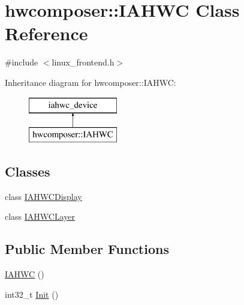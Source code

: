 \hypertarget{classhwcomposer_1_1IAHWC}{}\section{hwcomposer\+:\+:I\+A\+H\+WC Class Reference}
\label{classhwcomposer_1_1IAHWC}


{\ttfamily \#include $<$linux\+\_\+frontend.\+h$>$}

Inheritance diagram for hwcomposer\+:\+:I\+A\+H\+WC\+:\begin{figure}[H]
\begin{center}
\leavevmode
\includegraphics[height=2.000000cm]{classhwcomposer_1_1IAHWC}
\end{center}
\end{figure}
\subsection*{Classes}
\begin{DoxyCompactItemize}
\item 
class \mbox{\hyperlink{classhwcomposer_1_1IAHWC_1_1IAHWCDisplay}{I\+A\+H\+W\+C\+Display}}
\item 
class \mbox{\hyperlink{classhwcomposer_1_1IAHWC_1_1IAHWCLayer}{I\+A\+H\+W\+C\+Layer}}
\end{DoxyCompactItemize}
\subsection*{Public Member Functions}
\begin{DoxyCompactItemize}
\item 
\mbox{\hyperlink{classhwcomposer_1_1IAHWC_a5dcce49d920bb707fc1bcd6357c87006}{I\+A\+H\+WC}} ()
\item 
int32\+\_\+t \mbox{\hyperlink{classhwcomposer_1_1IAHWC_afdb49a5ff4e943fb5f874b9c6fbb431f}{Init}} ()
\end{DoxyCompactItemize}

